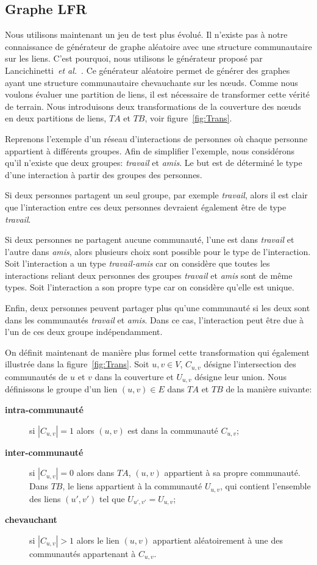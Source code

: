 \subsection{Graphe LFR}

Nous utilisons maintenant un jeu de test plus évolué.
Il n'existe pas à notre connaissance de générateur de graphe aléatoire avec une structure communautaire sur les liens.
C'est pourquoi, nous utilisons le générateur proposé par Lancichinetti~\textit{et al.}~\cite{Lancichinetti2009b}.
Ce générateur aléatoire permet de générer des graphes ayant une structure communautaire chevauchante sur les n\oe uds.
Comme nous voulons évaluer une partition de liens, il est nécessaire de transformer cette vérité de terrain.
Nous introduisons deux transformations de la couverture des n\oe uds en deux partitions de liens, $TA$ et $TB$, voir figure~\ref{fig:Trans}.


Reprenons l'exemple d'un réseau d'interactions de personnes où chaque personne appartient à différents groupes.
Afin de simplifier l'exemple, nous considérons qu'il n'existe que deux groupes: \emph{travail} et \emph{amis}.
Le but est de déterminé le type d'une interaction à partir des groupes des personnes.

Si deux personnes partagent un seul groupe, par exemple \emph{travail}, alors il est clair que l'interaction entre ces deux personnes devraient également être de type \emph{travail}.

Si deux personnes ne partagent aucune communauté, l'une est dans \emph{travail} et l'autre dans \emph{amis}, alors plusieurs choix sont possible pour le type de l'interaction.
Soit l'interaction a un type \emph{travail-amis} car on considère que toutes les interactions reliant deux personnes des groupes \emph{travail} et \emph{amis} sont de même types.
Soit l'interaction a son propre type car on considère qu'elle est unique.

Enfin, deux personnes peuvent partager plus qu'une communauté si les deux sont dans les communautés \emph{travail} et \emph{amis}.
Dans ce cas, l'interaction peut être due à l'un de ces deux groupe indépendamment.

On définit maintenant de manière plus formel cette transformation qui également illustrée dans la figure~\ref{fig:Trans}.
Soit $u,v \in V$, $C_{u,v}$ désigne l'intersection des communautés de $u$ et $v$ dans la couverture et $U_{u,v}$ désigne leur union.
Nous définissons le groupe d'un lien $(u,v) \in E$ dans $TA$ et $TB$ de la manière suivante:
\begin{description}
\item[\textbf{intra-communauté}] si $|C_{u,v}| = 1$ alors $(u,v)$ est dans la communauté $C_{u,v}$;
\item[\textbf{inter-communauté}] si $|C_{u,v}| = 0$ alors dans $TA$, $(u,v)$ appartient à sa propre communauté.
Dans $TB$, le liens appartient à la communauté $U_{u,v}$, qui contient l'ensemble des liens $(u',v')$ tel que $U_{u',v'}=U_{u,v}$;
\item[\textbf{chevauchant}] si $|C_{u,v}| > 1$ alors le lien $(u,v)$ appartient aléatoirement à une des communautés appartenant à $C_{u,v}$.
\end{description}

